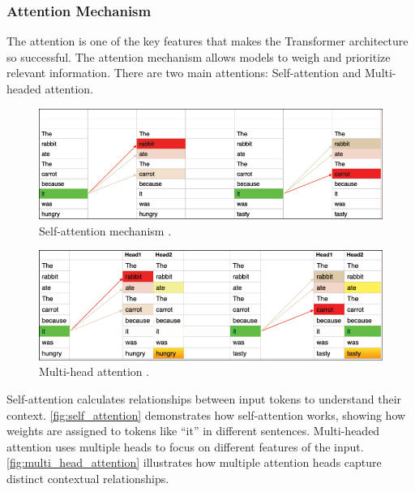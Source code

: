 \subsubsection*{Attention Mechanism}

The attention is one of the key features that makes the Transformer architecture so successful. The attention mechanism allows models to weigh and prioritize relevant information. There are two main attentions: Self-attention and Multi-headed attention.

\begin{figure}[htbp]
    \centering
    \includegraphics[width=0.99\linewidth]{obrazky-figures/02-theoretical-basis/self-attention.png}
    \caption{Self-attention mechanism \cite{timsina2024building}.}
    \label{fig:self_attention}
\end{figure}

\begin{figure}[htbp]
    \centering
    \includegraphics[width=0.99\linewidth]{obrazky-figures/02-theoretical-basis/multi-head-attention.png}
    \caption{Multi-head attention \cite{timsina2024building}.}
    \label{fig:multi_head_attention}
\end{figure}

Self-attention calculates relationships between input tokens to understand their context. \autoref{fig:self_attention} demonstrates how self-attention works, showing how weights are assigned to tokens like \enquote{it} in different sentences. Multi-headed attention uses multiple heads to focus on different features of the input. \autoref{fig:multi_head_attention} illustrates how multiple attention heads capture distinct contextual relationships.

